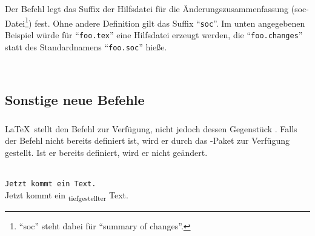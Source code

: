\begin{chusage}
		\>\\
	\usageexample
		\>\\
		\>
\end{chusage}



\subsubsection{}
\DescribeMacro{\setsocextension}

Der Befehl  legt das Suffix der Hilfsdatei für die Änderungszusammenfassung (soc-Datei\footnote{%
	"`soc"' steht dabei für "`summary of changes"'.
}) fest.
Ohne andere Definition gilt das Suffix "`\texttt{soc}"'.
Im unten angegebenen Beispiel würde für "`\texttt{foo.tex}"' eine Hilfsdatei erzeugt werden, die "`\texttt{foo.changes}"' statt des Standardnamens "`\texttt{foo.soc}"' hieße.

\begin{chusage}
		\>\\
	\usageexample
		\>
\end{chusage}



\subsection{Sonstige neue Befehle}
\label{sec:user:other}

\subsubsection{}
\DescribeMacro{\textsubscript}

\LaTeX\ stellt den Befehl  zur Verfügung, nicht jedoch dessen Gegenstück .
Falls der Befehl nicht bereits definiert ist, wird er durch das -Paket zur Verfügung gestellt.
Ist er bereits definiert, wird er nicht geändert.
\begin{chusage}
		\>\\
	\usageexample
		\>\texttt{Jetzt kommt ein  Text.}\\
		\>Jetzt kommt ein \textsubscript{tiefgestellter} Text.
\end{chusage}


